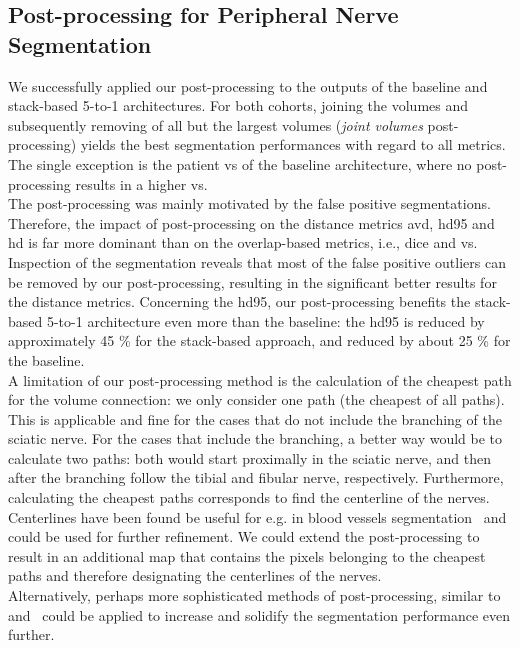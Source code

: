 \subsection{Post-processing for Peripheral Nerve Segmentation}
We successfully applied our post-processing to the outputs of the baseline and stack-based 5-to-1 architectures. For both cohorts, joining the volumes and subsequently removing of all but the largest volumes (\textit{joint volumes} post-processing) yields the best segmentation performances with regard to all metrics. The single exception is the patient \acrlong{vs} of the baseline architecture, where no post-processing results in a higher \gls{vs}.\\
The post-processing was mainly motivated by the false positive segmentations. Therefore, the impact of post-processing on the distance metrics \gls{avd}, \gls{hd95} and \gls{hd} is far more dominant than on the overlap-based metrics, i.e., \gls{dice} and \gls{vs}. Inspection of the segmentation reveals that most of the false positive outliers can be removed by our post-processing, resulting in the significant better results for the distance metrics.
Concerning the \acrlong{hd95}, our post-processing benefits the stack-based 5-to-1 architecture even more than the baseline: the \gls{hd95} is reduced by approximately 45 \% for the stack-based approach, and reduced by about 25 \% for the baseline.\\
A limitation of our post-processing method is the calculation of the cheapest path for the volume connection: we only consider one path (the cheapest of all paths). This is applicable and fine for the cases that do not include the branching of the sciatic nerve. For the cases that include the branching, a better way would be to calculate two paths: both would start proximally in the sciatic nerve, and then after the branching follow the tibial and fibular nerve, respectively.
Furthermore, calculating the cheapest paths corresponds to find the centerline of the nerves. Centerlines have been found be useful for e.g. in blood vessels segmentation~\cite{Lesage2009ASchemes} and could be used for further refinement. We could extend the post-processing to result in an additional map that contains the pixels belonging to the cheapest paths and therefore designating the centerlines of the nerves.\\
Alternatively, perhaps more sophisticated methods of post-processing, similar to~\cite{Rempfler2015ReconstructingProgramming} and~\cite{Selvan2018ExtractionNetworks} could be applied to increase and solidify the segmentation performance even further. 

